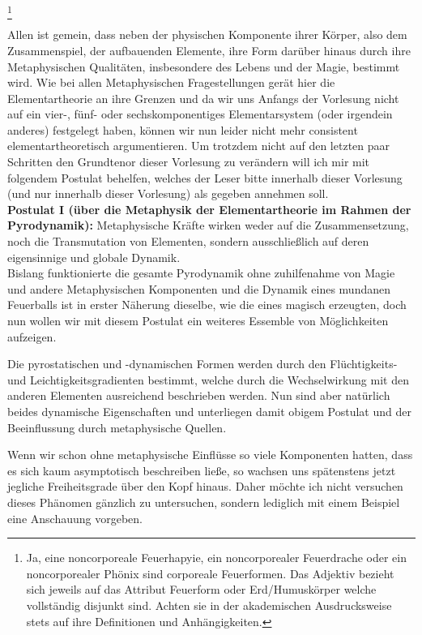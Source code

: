 \documentclass[a5paper,8pt]{book}
\begin{document}
\footnote[5]{Ja, eine noncorporeale Feuerhapyie, ein noncorporealer Feuerdrache oder ein noncorporealer Phönix sind corporeale 
Feuerformen. Das Adjektiv bezieht sich jeweils auf das Attribut Feuerform oder Erd/Humuskörper welche vollständig disjunkt 
sind. Achten sie in der akademischen Ausdrucksweise stets auf ihre Definitionen und Anhängigkeiten.}


Allen ist gemein, dass neben der physischen Komponente ihrer Körper, also dem Zusammenspiel, der aufbauenden Elemente, 
ihre Form darüber hinaus durch ihre Metaphysischen Qualitäten, insbesondere des Lebens und der Magie, bestimmt wird.
Wie bei allen Metaphysischen Fragestellungen gerät hier die Elementartheorie an ihre Grenzen und da wir uns Anfangs der 
Vorlesung nicht auf ein vier-, fünf- oder sechskomponentiges Elementarsystem (oder irgendein anderes) festgelegt haben, 
können wir nun leider nicht mehr consistent elementartheoretisch argumentieren.
Um trotzdem nicht auf den letzten paar Schritten den Grundtenor dieser Vorlesung zu verändern will ich mir mit folgendem 
Postulat behelfen, welches der Leser bitte innerhalb dieser Vorlesung (und nur innerhalb dieser Vorlesung) als gegeben 
annehmen soll.\\

\textbf{Postulat I (über die Metaphysik der Elementartheorie im Rahmen der Pyrodynamik):}
Metaphysische Kräfte wirken weder auf die Zusammensetzung, noch die Transmutation von Elementen, sondern ausschließlich 
auf deren eigensinnige und globale Dynamik.\\

Bislang funktionierte die gesamte Pyrodynamik ohne zuhilfenahme von Magie und andere Metaphysischen Komponenten und die 
Dynamik eines mundanen Feuerballs ist in erster Näherung dieselbe, wie die eines magisch erzeugten, doch nun wollen wir 
mit diesem Postulat ein weiteres Essemble von Möglichkeiten aufzeigen.

Die pyrostatischen und -dynamischen Formen werden durch den Flüchtigkeits- und Leichtigkeitsgradienten bestimmt, welche 
durch die Wechselwirkung mit den anderen Elementen ausreichend beschrieben werden. Nun sind aber natürlich beides 
dynamische Eigenschaften und unterliegen damit obigem Postulat und der Beeinflussung durch metaphysische Quellen.

Wenn wir schon ohne metaphysische Einflüsse so viele Komponenten hatten, dass es sich kaum asymptotisch beschreiben ließe, 
so wachsen uns spätenstens jetzt jegliche Freiheitsgrade über den Kopf hinaus. Daher möchte ich nicht versuchen dieses 
Phänomen gänzlich zu untersuchen, sondern lediglich mit einem Beispiel eine Anschauung vorgeben.
\end{document}
